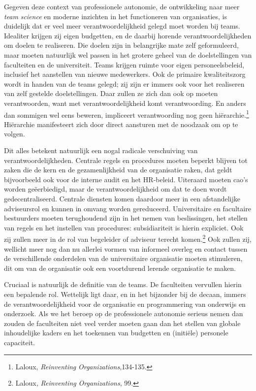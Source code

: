 \documentclass[smallauthor, chapterhaspagenum, nochapterinheader, pagenuminheader,  bigchapnum,medium2, tocpages,  garamond, titleinheader]{jote-book}
\begin{document}
	Gegeven deze context van professionele autonomie, de ontwikkeling naar meer \emph{team }\emph{science} en moderne inzichten in het functioneren van organisaties, is duidelijk dat er veel meer verantwoordelijkheid gelegd moet worden bij teams. Idealiter krijgen zij eigen budgetten, en de daarbij horende verantwoordelijkheden om doelen te realiseren. Die doelen zijn in belangrijke mate zelf geformuleerd, maar moeten natuurlijk wel passen in het grotere geheel van de doelstellingen van faculteiten en de universiteit. Teams krijgen ruimte voor eigen personeelsbeleid, inclusief het aanstellen van nieuwe medewerkers. Ook de primaire kwaliteitszorg wordt in handen van de teams gelegd; zij zijn er immers ook voor het realiseren van zelf gestelde doelstellingen. Daar zullen ze zich dan ook op moeten verantwoorden, want met verantwoordelijkheid komt verantwoording. En anders dan sommigen wel eens beweren, impliceert verantwoording nog geen hiërarchie.\footnote{Laloux, \emph{Reinventing}\emph{ Organizations},134-135.} Hiërarchie manifesteert zich door direct aansturen met de noodzaak om op te volgen.



	Dit alles betekent natuurlijk een nogal radicale verschuiving van verantwoordelijkheden. Centrale regels en procedures moeten beperkt blijven tot zaken die de kern en de gezamenlijkheid van de organisatie raken, dat geldt bijvoorbeeld ook voor de interne audit en het HR-beleid. Uiteraard moeten cao's worden geëerbiedigd, maar de verantwoordelijkheid om dat te doen wordt gedecentraliseerd. Centrale diensten komen daardoor meer in een afstandelijke adviseursrol en kunnen in omvang worden gereduceerd. Universitaire en facultaire bestuurders moeten terughoudend zijn in het nemen van beslissingen, het stellen van regels en het instellen van procedures: subsidiariteit is hierin expliciet. Ook zij zullen meer in de rol van begeleider of adviseur terecht komen.\footnote{Laloux\emph{,} \emph{Reinventing}\emph{ }\emph{Organizations}, 99.} Ook zullen zij, wellicht meer nog dan nu allerlei vormen van informeel overleg en contact tussen de verschillende onderdelen van de universitaire organisatie moeten stimuleren, dit om van de organisatie ook een voortdurend lerende organisatie te maken.



	Cruciaal is natuurlijk de definitie van de teams. De faculteiten vervullen hierin een bepalende rol. Wettelijk ligt daar, en in het bijzonder bij de decaan, immers de verantwoordelijkheid voor de organisatie en programmering van onderwijs en onderzoek. Als we het beroep op de professionele autonomie serieus nemen dan zouden de faculteiten niet veel verder moeten gaan dan het stellen van globale inhoudelijke kaders en het toekennen van budgetten en (initiële) personele capaciteit.
\end{document}
